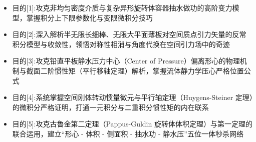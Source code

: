 \documentclass[11pt,a4paper,UTF8]{ctexart}
\begin{document}
\pagestyle{fancy}
\fancyhf{}
\fancyhead[R]{\small\color{TitlePurple}\nouppercase{\leftmark}}
\renewcommand{\headrulewidth}{0.5pt}

\tableofcontents
\newpage
{}


\begin{targetbox}[本章复习目标与核心知识图谱]
\begin{itemize}
  \item 目的[1]:攻克非均匀密度介质与复杂异形旋转体容器抽水做功的高阶变力模型，掌握积分上下限参数化与变限微积分技巧
\end{itemize}
\end{targetbox}

\begin{targetbox}[本章复习目标与核心知识图谱]
\begin{itemize}
  \item 目的[2]:深入解析半无限长细棒、无限大平面薄板对空间质点引力矢量的反常积分模型与收敛性，领悟对称性相消与角度代换在空间引力场中的奇迹
\end{itemize}
\end{targetbox}

\begin{targetbox}[本章复习目标与核心知识图谱]
\begin{itemize}
  \item 目的[3]:攻克铅直平板静水压力中心（Center of Pressure）偏离形心的物理机制与截面二阶惯性矩（平行移轴定理）解析，掌握流体静力学压心严格位置公式
\end{itemize}
\end{targetbox}

\begin{targetbox}[本章复习目标与核心知识图谱]
\begin{itemize}
  \item 目的[4]:系统掌握空间刚体转动惯量微元与平行轴定理（Huygens-Steiner 定理）的微积分严格证明，打通一元积分与二重积分惯性矩的内在联系
\end{itemize}
\end{targetbox}

\begin{targetbox}[本章复习目标与核心知识图谱]
\begin{itemize}
  \item 目的[5]:攻克古鲁金第二定理（Pappus-Guldin 旋转体体积定理）与第一定理的联合运用，建立“形心 - 体积 - 侧面积 - 抽水功 - 静水压”五位一体秒杀网络
\end{itemize}
\end{targetbox}
\end{document}
